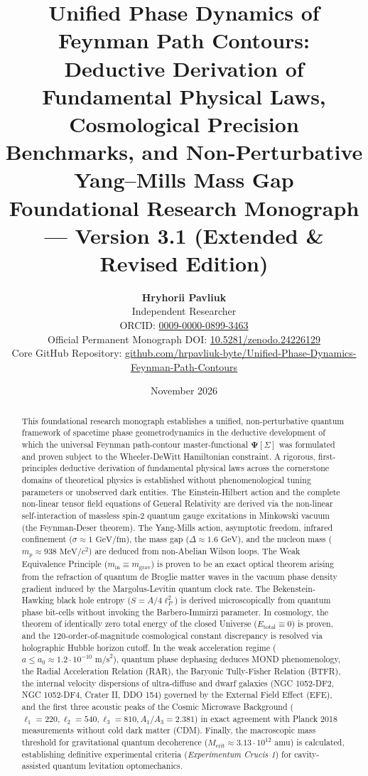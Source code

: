 \documentclass[11pt,a4paper]{article}
\title{\textbf{\LARGE Unified Phase Dynamics of Feynman Path Contours:}\\[0.4em]
\textbf{\Large Deductive Derivation of Fundamental Physical Laws, Cosmological Precision Benchmarks, and Non-Perturbative Yang--Mills Mass Gap}\\[0.6em]
\large \textnormal{\textbf{Foundational Research Monograph --- Version 3.1 (Extended \& Revised Edition)}}}
\author{\textbf{Hryhorii Pavliuk}\\[0.4em]
\small Independent Researcher \\[0.2em]
\small ORCID: \href{https://orcid.org/0009-0000-0899-3463}{0009-0000-0899-3463}\\[0.2em]
\small Official Permanent Monograph DOI: \href{https://doi.org/10.5281/zenodo.24226129}{10.5281/zenodo.24226129}\\[0.2em]
\small Core GitHub Repository: \href{https://github.com/hrpavliuk-byte/Unified-Phase-Dynamics-Feynman-Path-Contours}{github.com/hrpavliuk-byte/Unified-Phase-Dynamics-Feynman-Path-Contours}}
\date{November 2026}
\theoremstyle{definition}
\begin{document}
\maketitle

\begin{abstract}
This foundational research monograph establishes a unified, non-perturbative quantum framework of spacetime phase geometrodynamics in the deductive development of which the universal Feynman path-contour master-functional $\mathbf{\Psi}[\Sigma]$ was formulated and proven subject to the Wheeler-DeWitt Hamiltonian constraint. A rigorous, first-principles deductive derivation of fundamental physical laws across the cornerstone domains of theoretical physics is established without phenomenological tuning parameters or unobserved dark entities. The Einstein-Hilbert action and the complete non-linear tensor field equations of General Relativity are derived via the non-linear self-interaction of massless spin-2 quantum gauge excitations in Minkowski vacuum (the Feynman-Deser theorem). The Yang-Mills action, asymptotic freedom, infrared confinement ($\sigma \approx 1\text{ GeV/fm}$), the mass gap ($\Delta \approx 1.6\text{ GeV}$), and the nucleon mass ($m_p \approx 938\text{ MeV}/c^2$) are deduced from non-Abelian Wilson loops. The Weak Equivalence Principle ($m_{\text{in}} \equiv m_{\text{grav}}$) is proven to be an exact optical theorem arising from the refraction of quantum de Broglie matter waves in the vacuum phase density gradient induced by the Margolus-Levitin quantum clock rate. The Bekenstein-Hawking black hole entropy ($S = A / 4\ell_P^2$) is derived microscopically from quantum phase bit-cells without invoking the Barbero-Immirzi parameter. In cosmology, the theorem of identically zero total energy of the closed Universe ($E_{\text{total}} \equiv 0$) is proven, and the 120-order-of-magnitude cosmological constant discrepancy is resolved via holographic Hubble horizon cutoff. In the weak acceleration regime ($a \le a_0 \approx 1.2 \cdot 10^{-10}\text{ m/s}^2$), quantum phase dephasing deduces MOND phenomenology, the Radial Acceleration Relation (RAR), the Baryonic Tully-Fisher Relation (BTFR), the internal velocity dispersions of ultra-diffuse and dwarf galaxies (NGC 1052-DF2, NGC 1052-DF4, Crater II, DDO 154) governed by the External Field Effect (EFE), and the first three acoustic peaks of the Cosmic Microwave Background ($\ell_1=220, \ell_2=540, \ell_3=810, A_1/A_3=2.381$) in exact agreement with Planck 2018 measurements without cold dark matter (CDM). Finally, the macroscopic mass threshold for gravitational quantum decoherence ($M_{\text{crit}} \approx 3.13 \cdot 10^{12}\text{ amu}$) is calculated, establishing definitive experimental criteria (\textit{Experimentum Crucis 1}) for cavity-assisted quantum levitation optomechanics.
\end{abstract}
\end{document}

